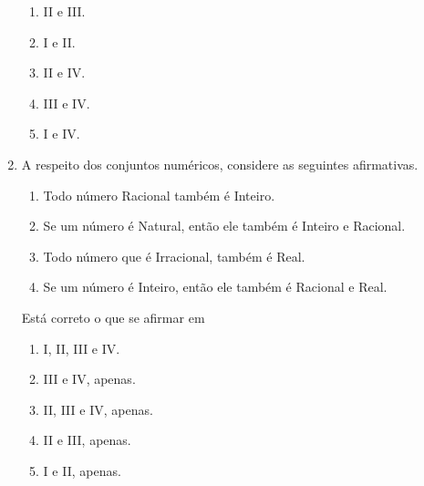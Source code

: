 \documentclass[a4paper,14pt]{article}
\begin{document}
\begin{enumerate}
        \begin{enumerate}
        	\item II e III.
        	\item I e II.
        	\item II e IV.
        	\item III e IV.
        	\item I e IV.
        \end{enumerate}
        
        \item A respeito dos conjuntos numéricos, considere as seguintes afirmativas.
        \begin{enumerate}[label=\Roman*.]
        	\item Todo número Racional também é Inteiro.
        	\item Se um número é Natural, então ele também é Inteiro e Racional.
        	\item Todo número que é Irracional, também é Real.
        	\item Se um número é Inteiro, então ele também é Racional e Real.
        \end{enumerate}
        
        Está correto o que se afirmar em
        
        \begin{enumerate}
        	\item I, II, III e IV.
        	\item III e IV, apenas. 
        	\item II, III e IV, apenas.
        	\item II e III, apenas.
        	\item I e II, apenas.
        \end{enumerate}
        
	\end{enumerate}
    

	
\end{document}
